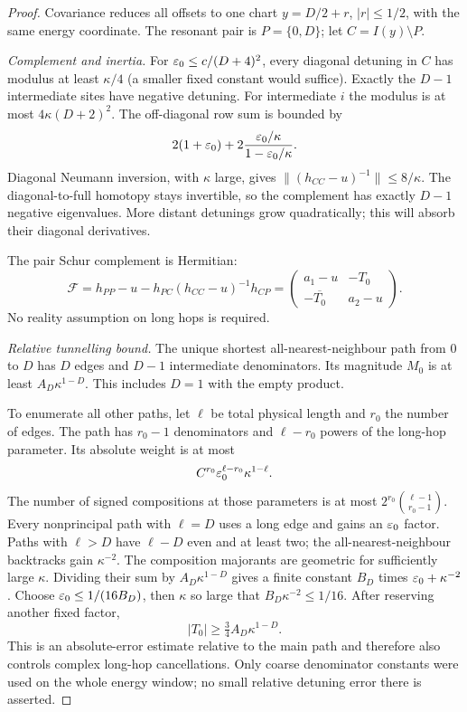 \begin{proof}
Covariance reduces all offsets to one chart
$y=D/2+r$, $|r|\le1/2$, with the same energy coordinate.
The resonant pair is $P=\{0,D\}$; let $C=I(y)\setminus P$.

\emph{Complement and inertia.}
For $\varepsilon_0\le c/(D+4)^2$, every diagonal detuning in $C$ has modulus at least $\kappa/4$ (a smaller fixed constant would suffice). Exactly the $D-1$ intermediate sites have negative detuning. For intermediate $i$ the modulus is at most $4\kappa(D+2)^2$. The off-diagonal row sum is bounded by
\[
 2(1+\varepsilon_0)+2\frac{\varepsilon_0/\kappa}{1-\varepsilon_0/\kappa}.
\]
Diagonal Neumann inversion, with $\kappa$ large, gives
$\|(h_{CC}-u)^{-1}\|\le8/\kappa$.
The diagonal-to-full homotopy stays invertible, so the complement has exactly $D-1$ negative eigenvalues. More distant detunings grow quadratically; this will absorb their diagonal derivatives.

The pair Schur complement is Hermitian:
\[
 \mathcal F=h_{PP}-u-h_{PC}(h_{CC}-u)^{-1}h_{CP}
 =\begin{pmatrix}a_1-u&-T_0\\-\overline{T_0}&a_2-u\end{pmatrix}.
\]
No reality assumption on long hops is required.

\emph{Relative tunnelling bound.}
The unique shortest all-nearest-neighbour path from $0$ to $D$ has $D$ edges and $D-1$ intermediate denominators. Its magnitude $M_0$ is at least $A_D\kappa^{1-D}$. This includes $D=1$ with the empty product.

To enumerate all other paths, let $\ell$ be total physical length and $r_0$ the number of edges. The path has $r_0-1$ denominators and $\ell-r_0$ powers of the long-hop parameter. Its absolute weight is at most
\[
 C^{r_0}\varepsilon_0^{\ell-r_0}\kappa^{1-\ell}.
\]
The number of signed compositions at those parameters is at most
$2^{r_0}\binom{\ell-1}{r_0-1}$.
Every nonprincipal path with $\ell=D$ uses a long edge and gains an $\varepsilon_0$ factor. Paths with $\ell>D$ have $\ell-D$ even and at least two; the all-nearest-neighbour backtracks gain $\kappa^{-2}$. The composition majorants are geometric for sufficiently large $\kappa$. Dividing their sum by $A_D\kappa^{1-D}$ gives a finite constant $B_D$ times $\varepsilon_0+\kappa^{-2}$.
Choose $\varepsilon_0\le1/(16B_D)$, then $\kappa$ so large that $B_D\kappa^{-2}\le1/16$. After reserving another fixed factor,
\begin{equation}\label{eq:belowtunnel}
 |T_0|\ge\tfrac34 A_D\kappa^{1-D}.
\end{equation}
This is an absolute-error estimate relative to the main path and therefore also controls complex long-hop cancellations. Only coarse denominator constants were used on the whole energy window; no small relative detuning error there is asserted.


\end{proof}
